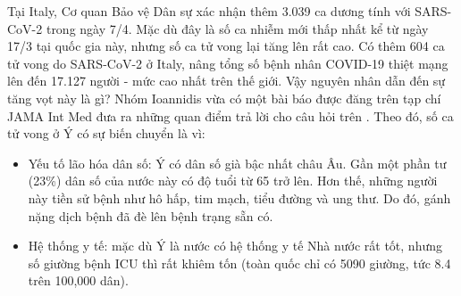 \documentclass[12pt, a4paper,oneside]{book}
\theoremstyle{definition}
\begin{document}
Tại Italy, Cơ quan Bảo vệ Dân sự xác nhận thêm 3.039 ca dương tính với SARS-CoV-2 trong ngày 7/4. Mặc dù đây là số ca nhiễm mới thấp nhất kể từ ngày 17/3 tại quốc gia này, nhưng số ca tử vong lại tăng lên rất cao. Có thêm 604 ca tử vong do SARS-CoV-2 ở Italy, nâng tổng số bệnh nhân COVID-19 thiệt mạng lên đến 17.127 người - mức cao nhất trên thế giới. Vậy nguyên nhân dẫn đến sự tăng vọt này là gì? Nhóm Ioannidis vừa có một bài báo được đăng trên tạp chí JAMA Int Med đưa ra những quan điểm trả lời cho câu hỏi trên \cite{16}. Theo đó, số ca tử vong ở Ý có sự biến chuyển là vì:
\begin{itemize}
	\item Yếu tố lão hóa dân số: Ý có dân số già bậc nhất châu Âu. Gần một phần tư (23\%) dân số của nước này có độ tuổi từ 65 trở lên. Hơn thế, những người này tiền sử bệnh như hô hấp, tim mạch, tiểu đường và ung thư. Do đó, gánh nặng dịch bệnh đã đè lên bệnh trạng sẵn có.
	\item Hệ thống y tế: mặc dù Ý là nước có hệ thống y tế Nhà nước rất tốt, nhưng số giường bệnh ICU thì rất khiêm tốn (toàn quốc chỉ có 5090 giường, tức 8.4 trên 100,000 dân).
\end{itemize}
\end{document}
